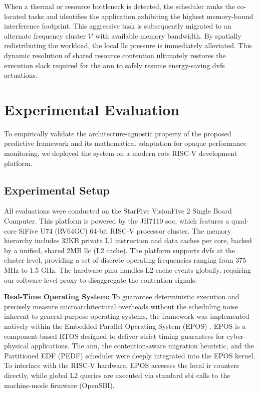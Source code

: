 \documentclass[conference]{IEEEtran}
\begin{document}
When a thermal or resource bottleneck is detected, the scheduler ranks the co-located tasks and identifies the application exhibiting the highest memory-bound interference footprint. This aggressive task is subsequently migrated to an alternate frequency cluster $\mathcal{V}$ with available memory bandwidth. By spatially redistributing the workload, the local \gls{llc} pressure is immediately alleviated. This dynamic resolution of shared resource contention ultimately restores the execution slack required for the \gls{ann} to safely resume energy-saving \gls{dvfs} actuations.


\section{Experimental Evaluation}
To empirically validate the architecture-agnostic property of the proposed predictive framework and its mathematical adaptation for opaque performance monitoring, we deployed the system on a modern \gls{cots} RISC-V development platform.

\subsection{Experimental Setup}

All evaluations were conducted on the StarFive VisionFive 2 Single Board Computer. This platform is powered by the JH7110 \gls{soc}, which features a quad-core SiFive U74 (RV64GC) 64-bit RISC-V processor cluster. The memory hierarchy includes 32KB private L1 instruction and data caches per core, backed by a unified, shared 2MB \gls{llc} (L2 cache). The platform supports \gls{dvfs} at the cluster level, providing a set of discrete operating frequencies ranging from 375 MHz to 1.5 GHz. The hardware \gls{pmu} handles L2 cache events globally, requiring our software-level proxy to disaggregate the contention signals.

\textbf{Real-Time Operating System:} To guarantee deterministic execution and precisely measure microarchitectural overheads without the scheduling noise inherent to general-purpose operating systems, the framework was implemented natively within the Embedded Parallel Operating System (EPOS) \cite{epos_lisha}. EPOS is a component-based RTOS designed to deliver strict timing guarantees for cyber-physical applications. The \gls{ann}, the contention-aware migration heuristic, and the Partitioned EDF (PEDF) scheduler were deeply integrated into the EPOS kernel. To interface with the RISC-V hardware, EPOS accesses the local \gls{ir} counters directly, while global L2 queries are executed via standard \gls{sbi} calls to the machine-mode firmware (OpenSBI).
\end{document}
